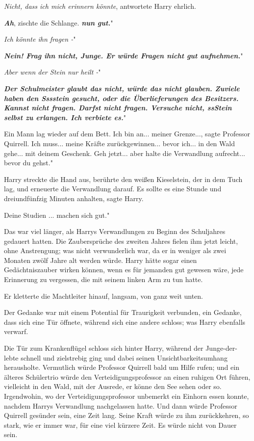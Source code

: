 \glqq{}\emph{Nicht, dass ich mich erinnern könnte}\grqq{}, antwortete Harry
ehrlich.

\glqq{}\textbf{\emph{Ah}}\grqq{}, zischte die Schlange. \glqq{}\textbf{\emph{nun
gut.}}"

\glqq{}\emph{Ich könnte ihn fragen -}"

\glqq{}\textbf{\emph{Nein! Frag ihn nicht, Junge. Er würde Fragen nicht gut
aufnehmen.}}"

\glqq{}\emph{Aber wenn der Stein nur heilt -}"

\glqq{}\textbf{\emph{Der Schulmeister glaubt das nicht, würde das nicht glauben.
Zuviele haben den Sssstein gesucht, oder die Überlieferungen des Besitzers.
Kannst nicht fragen. Darfst nicht fragen. Versuche nicht, ssStein selbst zu
erlangen. Ich verbiete es.}}"

Ein Mann lag wieder auf dem Bett. \glqq{}Ich bin an... meiner Grenze...\grqq{},
sagte Professor Quirrell. \glqq{}Ich muss... meine Kräfte zurückgewinnen... bevor
ich... in den Wald gehe... mit deinem Geschenk. Geh jetzt... aber halte die
Verwandlung aufrecht... bevor du gehst."

Harry streckte die Hand aus, berührte den weißen Kieselstein, der in dem Tuch
lag, und erneuerte die Verwandlung darauf. \glqq{}Es sollte es eine Stunde und
dreiundfünfzig Minuten anhalten\grqq{}, sagte Harry.

\glqq{}Deine Studien ... machen sich gut."

Das war viel länger, als Harrys Verwandlungen zu Beginn des Schuljahres gedauert
hatten. Die Zaubersprüche des zweiten Jahres fielen ihm jetzt leicht, ohne
Anstrengung; was nicht verwunderlich war, da er in weniger als zwei Monaten
zwölf Jahre alt werden würde. Harry hätte sogar einen Gedächtniszauber wirken
können, wenn es für jemanden gut gewesen wäre, jede Erinnerung zu vergessen, die
mit seinem linken Arm zu tun hatte.

Er kletterte die Machtleiter hinauf, langsam, von ganz weit unten.

Der Gedanke war mit einem Potential für Traurigkeit verbunden, ein Gedanke, dass
sich eine Tür öffnete, während sich eine andere schloss; was Harry ebenfalls
verwarf.

Die Tür zum Krankenflügel schloss sich hinter Harry, während der Junge-der-lebte
schnell und zielstrebig ging und dabei seinen Unsichtbarkeitsumhang herausholte.
Vermutlich würde Professor Quirrell bald um Hilfe rufen; und ein älteres
Schülertrio würde den Verteidigungsprofessor an einen ruhigen Ort führen,
vielleicht in den Wald, mit der Ausrede, er könne den See sehen oder so.
Irgendwohin, wo der Verteidigungsprofessor unbemerkt ein Einhorn essen konnte,
nachdem Harrys Verwandlung nachgelassen hatte. Und dann würde Professor Quirrell
gesünder sein, eine Zeit lang. Seine Kraft würde zu ihm zurückkehren, so stark,
wie er immer war, für eine viel kürzere Zeit. Es würde nicht von Dauer sein.

